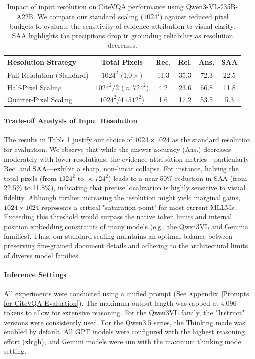 \documentclass{llmxive}
\begin{document}
{{{\begin{table}[htbp]
\centering
\small
\begin{tabular}{@{}l c cccc@{}}
\toprule
\textbf{Resolution Strategy} & \textbf{Total Pixels} & \textbf{Rec.} & \textbf{Rel.} & \textbf{Ans.} & \textbf{SAA} \\ \midrule
Full Resolution (Standard) & $1024^2$ ($1.0\times$) &11.3&35.3&72.3&22.5 \\
Half-Pixel Scaling & $1024^2 / 2$ ($\approx 724^2$) &4.2&23.6&66.8&11.8 \\
Quarter-Pixel Scaling & $1024^2 / 4$ ($512^2$) &1.6&17.2&53.5&5.3 \\ \bottomrule
\end{tabular}
\caption{Impact of input resolution on CiteVQA performance using Qwen3-VL-235B-A22B. We compare our standard scaling ($1024^2$) against reduced pixel budgets to evaluate the sensitivity of evidence attribution to visual clarity. SAA highlights the precipitous drop in grounding reliability as resolution decreases.}
\label{tab:resolution_impact}
\end{table}

\paragraph{Trade-off Analysis of Input Resolution}
The results in Table \ref{tab:resolution_impact} justify our choice of $1024 \times 1024$ as the standard resolution for evaluation. We observe that while the answer accuracy (Ans.) decreases moderately with lower resolutions, the evidence attribution metrics---particularly Rec. and SAA---exhibit a sharp, non-linear collapse. For instance, halving the total pixels (from $1024^2$ to $\approx 724^2$) leads to a near-50\% reduction in SAA (from 22.5\% to 11.8\%), indicating that precise localization is highly sensitive to visual fidelity. Although further increasing the resolution might yield marginal gains, $1024 \times 1024$ represents a critical "saturation point" for most current MLLMs. Exceeding this threshold would surpass the native token limits and internal position embedding constraints of many models (e.g., the Qwen3VL and Gemma families). Thus, our standard scaling maintains an optimal balance between preserving fine-grained document details and adhering to the architectural limits of diverse model families.

\paragraph{Inference Settings} All experiments were conducted using a unified prompt (See Appendix~\ref{Prompts for CiteVQA Evaluation}). The maximum output length was capped at 4,096 tokens to allow for extensive reasoning. For the Qwen3VL family, the "Instruct" versions were consistently used. For the Qwen3.5 series, the Thinking mode was enabled by default. All GPT models were configured with the highest reasoning effort (xhigh), and Gemini models were run with the maximum thinking mode setting.

}}}
\end{document}
